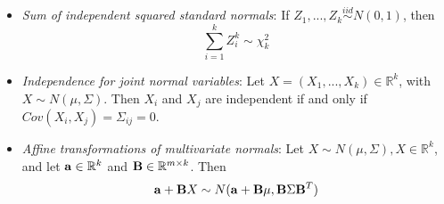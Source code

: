 \documentclass[11pt]{article}
\begin{document}
\begin{itemize}
\item \textit{Sum of independent squared standard normals}: If $Z_1,...,Z_k \overset{iid}{\sim} N(0, 1)$, then 
$$\sum \limits_{i=1}^k Z_i^k \sim \chi^2_k$$

\item \textit{Independence for joint normal variables}: Let $X = (X_1,...,X_k) \in \mathbb{R}^k$, with $X \sim N(\mu, \Sigma)$. Then $X_i$ and $X_j$ are independent if and only if $Cov(X_i, X_j) = \Sigma_{ij} = 0$.

\item \textit{Affine transformations of multivariate normals}: Let $X \sim N(\mu, \Sigma), X \in \mathbb{R}^k$, and let ${\bf a} \in \mathbb{R}^k$ and ${\bf B} \in \mathbb{R}^{m \times k}$. Then
$${\bf a} + {\bf B}X \sim N({\bf a} + {\bf B}\mu, {\bf B} \Sigma {\bf B}^T)$$
\end{itemize}
\end{document}
